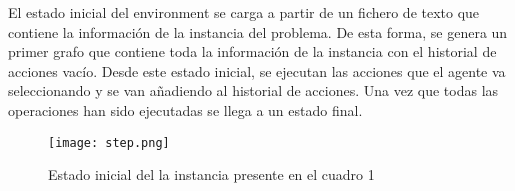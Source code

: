 El estado inicial del environment se carga a partir de un fichero de texto que contiene la información
de la instancia del problema. De esta forma, se genera un primer grafo que contiene toda la información
de la instancia con el historial de acciones vacío. Desde este estado inicial, se ejecutan las
acciones que el agente va seleccionando y se van añadiendo al historial de acciones. Una vez que todas
las operaciones han sido ejecutadas se llega a un estado final.

\begin{figure}[ht]
    \centering
    \texttt{[image: step.png]}
    \caption{Estado inicial del la instancia presente en el cuadro 1}\label{fig:step}
\end{figure}

\pagebreak
